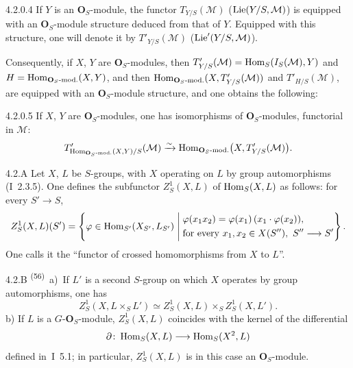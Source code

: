 \begin{definition}{4.2.0.4}\label{II.4.2.0.4}
{\renewcommand{\thefootnote}{(55)}}
If \(Y\) is an \(\mathbf{O}_{S}\)-module, the functor
\(T_{Y/S}(\mathcal{M})\) (\resp \(\operatorname{Lie}(Y/S,\mathcal{M})\)) is equipped with an
\(\mathbf{O}_{S}\)-module structure deduced from that of \(Y\). Equipped
with this structure, one will denote it by \(T'_{Y/S}(\mathcal{M})\)
(\resp \(\operatorname{Lie}'(Y/S,\mathcal{M})\)).
\end{definition}

Consequently, if \(X\), \(Y\) are \(\mathbf{O}_{S}\)-modules, then
\(T'_{Y/S}(\mathcal{M})=\operatorname{Hom}_{S}(I_{S}(\mathcal{M}),Y)\) and
\(H=\operatorname{Hom}_{\mathbf{O}_{S}\text{-mod.}}(X,Y)\), and then
\(\operatorname{Hom}_{\mathbf{O}_{S}\text{-mod.}}(X,T'_{Y/S}(\mathcal{M}))\) and
\(T'_{H/S}(\mathcal{M})\), are equipped with an \(\mathbf{O}_{S}\)-module
structure, and one obtains the following:

\begin{corollary}{4.2.0.5}\label{II.4.2.0.5}
If \(X\), \(Y\) are \(\mathbf{O}_{S}\)-modules, one has isomorphisms of
\(\mathbf{O}_{S}\)-modules, functorial in \(\mathcal{M}\):
\[
T'_{\operatorname{Hom}_{\mathbf{O}_{S}\text{-mod.}}(X,Y)/S}(\mathcal{M})
\xrightarrow{\sim}
\operatorname{Hom}_{\mathbf{O}_{S}\text{-mod.}}\bigl(X,T'_{Y/S}(\mathcal{M})\bigr).
\]
\end{corollary}

\begin{definition}{4.2.A}\label{II.4.2.A}
{\renewcommand{\thefootnote}{(56)}}
Let \(X\), \(L\) be \(S\)-groups, with \(X\) operating on \(L\) by group
automorphisms (\cf I~2.3.5). One defines the subfunctor \(Z^{1}_{S}(X,L)\)
of \(\operatorname{Hom}_{S}(X,L)\) as follows: for every \(S'\to S\),
\[
Z^{1}_{S}(X,L)(S')
=
\left\{
\varphi\in\operatorname{Hom}_{S'}(X_{S'},L_{S'})
\;\middle|\;
\begin{aligned}
&\varphi(x_{1}x_{2})=\varphi(x_{1})\,(x_{1}\cdot\varphi(x_{2})),\\
&\text{for every }x_{1},x_{2}\in X(S''),\ S''\longrightarrow S'
\end{aligned}
\right\}.
\]
One calls it the ``functor of crossed homomorphisms from \(X\) to \(L\)''.
\end{definition}

\begin{remark}{4.2.B}\label{II.4.2.B}
\textsuperscript{(56)}~a)~If \(L'\) is a second \(S\)-group on which \(X\) operates by group
automorphisms, one has
\[
Z^{1}_{S}(X,L\times_{S}L')
\simeq
Z^{1}_{S}(X,L)\times_{S}Z^{1}_{S}(X,L').
\]
b) If \(L\) is a \(G\)-\(\mathbf{O}_{S}\)-module, %
\(Z^{1}_{S}(X,L)\) coincides with the kernel of the differential
\[
\partial\colon\operatorname{Hom}_{S}(X,L)\longrightarrow\operatorname{Hom}_{S}(X^{2},L)
\]
defined in~I~5.1; in
particular, \(Z^{1}_{S}(X,L)\) is in this case an \(\mathbf{O}_{S}\)-module.
\end{remark}


